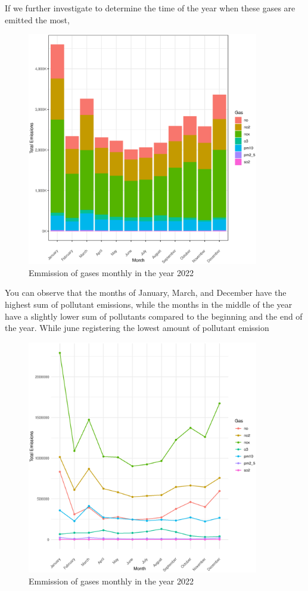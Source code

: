 \documentclass[]{article}
\begin{document}
If we further investigate to determine the time of the year when these gases are emitted the most,

\begin{figure}[H]
	\centering
	\includegraphics[width=0.9\textwidth]{Graphs/Total_per_month_by_gas_2.eps}
	\caption{Emmission of gases monthly in the year 2022}
	\label{fig:monthly gases }
\end{figure}

You can observe that the months of January, March, and December have the highest sum of pollutant emissions, while the months in the middle of the year have a slightly lower sum of pollutants compared to the beginning and the end of the year. While june registering the lowest amount of pollutant emission

\begin{figure}[H]
	\centering
	\includegraphics[width=0.9\textwidth]{Graphs/Total_per_month_by_gas_3.eps}
	\caption{Emmission of gases monthly in the year 2022}
	\label{fig:seperate monthly gases }
\end{figure}
\end{document}

